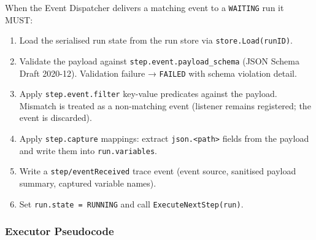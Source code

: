 When the Event Dispatcher delivers a matching event to a \texttt{WAITING} run it MUST:

\begin{enumerate}
  \item Load the serialised run state from the run store via \texttt{store.Load(runID)}.
  \item Validate the payload against \texttt{step.event.payload\_schema} (JSON Schema Draft
        2020-12). Validation failure → \texttt{FAILED} with schema violation detail.
  \item Apply \texttt{step.event.filter} key-value predicates against the payload. Mismatch
        is treated as a non-matching event (listener remains registered; the event is
        discarded).
  \item Apply \texttt{step.capture} mappings: extract \texttt{json.<path>} fields from the
        payload and write them into \texttt{run.variables}.
  \item Write a \texttt{step/eventReceived} trace event (event source, sanitised payload
        summary, captured variable names).
  \item Set \texttt{run.state = RUNNING} and call \texttt{ExecuteNextStep(run)}.
\end{enumerate}

\subsubsection*{Executor Pseudocode}

